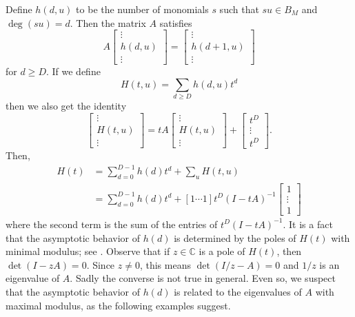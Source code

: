Define $h(d,u)$ to be the number of monomials $s$ such that $su\in B_M$ and $\deg(su) = d$. Then the matrix $A$ satisfies
\[
	A\begin{bmatrix}
	\vdots\\
	h(d,u)\\
	\vdots
	\end{bmatrix}
	=\begin{bmatrix}
	\vdots\\
	h(d+1,u)\\
	\vdots
	\end{bmatrix}
\]
for $d \geq D$. If we define
\[
	H(t,u) = \sum_{d\geq D} h(d,u)t^d
\]
then we also get the identity
\[
	\begin{bmatrix}
	\vdots\\
	H(t,u)\\
	\vdots
	\end{bmatrix}=
	tA\begin{bmatrix}
	\vdots\\
	H(t,u)\\
	\vdots
	\end{bmatrix}+
	\begin{bmatrix}
	t^D\\
	\vdots\\
	t^D
	\end{bmatrix}.
\]
Then,
\begin{align}
	H(t) &= \sum_{d=0}^{D-1} h(d)t^d + \sum_u H(t,u) \nonumber\\
	&= \sum_{d=0}^{D-1} h(d)t^d + [1 \cdots 1]
	t^D (I - tA)^{-1} \begin{bmatrix}
		1\\
		\vdots\\
		1
	\end{bmatrix} \label{eq:Poincare-series-formula}
\end{align}
where the second term is the sum of the entries of $t^D(I-tA)^{-1}$. It is a fact that the asymptotic behavior of $h(d)$ is determined by the poles of $H(t)$ with minimal modulus; see \cite[Theorem 5.2.1]{wilf}. Observe that if $z \in \mathbb{C}$ is a pole of $H(t)$, then $\det(I-zA) = 0$. Since $z \neq 0$, this means $\det(I/z - A) = 0$ and $1/z$ is an eigenvalue of $A$. Sadly the converse is not true in general. Even so, we suspect that the asymptotic behavior of $h(d)$ is related to the eigenvalues of $A$ with maximal modulus, as the following examples suggest.
